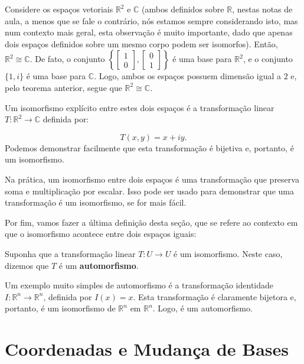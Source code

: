 \begin{Example}
	Considere os espaços vetoriais $\mathbb{R}^2$ e $\mathbb{C}$ (ambos definidos sobre $\mathbb{R}$, nestas notas de aula, a menos que se fale o contrário, nós estamos sempre considerando isto, mas num contexto mais geral, esta observação é muito importante, dado que apenas dois espaços definidos sobre um mesmo corpo podem ser isomorfos). Então, $\mathbb{R}^2\cong\mathbb{C}$. De fato, o conjunto $\left\{\begin{bmatrix}
		1 \\
		0
	\end{bmatrix}, \begin{bmatrix}
		0 \\
		1
	\end{bmatrix}\right\}$ é uma base para $\mathbb{R}^2$, e o conjunto $\{1, i\}$ é uma base para $\mathbb{C}$. Logo, ambos os espaços possuem dimensão igual a $2$ e, pelo teorema anterior, segue que $\mathbb{R}^2\cong\mathbb{C}$. 
	
	Um isomorfismo explícito entre estes dois espaços é a transformação linear $T:\mathbb{R}^2\to\mathbb{C}$ definida por:
	
	$$
	T(x, y) = x + iy.
	$$
	Podemos demonstrar facilmente que esta transformação é bijetiva e, portanto, é um isomorfismo.
\end{Example}

Na prática, um isomorfismo entre dois espaços é uma transformação que preserva soma e multiplicação por escalar. Isso pode ser usado para demonstrar que uma transformação é um isomorfismo, se for mais fácil.

Por fim, vamos fazer a última definição desta seção, que se refere ao contexto em que o isomorfismo acontece entre dois espaços iguais:

\begin{Definition}[Automorfismo]
	Suponha que a transformação linear $T:U\to U$ é um isomorfismo. Neste caso, dizemos que $T$ é um \textbf{automorfismo}.
\end{Definition}

Um exemplo muito simples de automorfismo é a transformação identidade $I:\mathbb{R}^n\to\mathbb{R}^n$, definida por $I(x) = x$. Esta transformação é claramente bijetora e, portanto, é um isomorfismo de $\mathbb{R}^n$ em $\mathbb{R}^n$. Logo, é um automorfismo.

\section{Coordenadas e Mudança de Bases}

